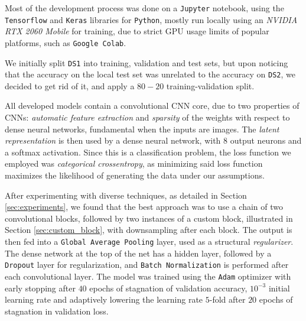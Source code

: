 \documentclass[11pt]{article}
\begin{document}
\begin{multicols}{2}


      Most of the development process was done on a \texttt{Jupyter} notebook, using the \texttt{Tensorflow}\cite{TensorFlow} and \texttt{Keras}\cite{chollet2015keras} libraries for \texttt{Python}, mostly run locally using an \textit{NVIDIA RTX 2060 Mobile} for training, due to strict GPU usage limits of popular platforms, such as \texttt{Google Colab}.

      We initially split \texttt{DS1} into training, validation and test sets, but upon noticing that the accuracy on the local test set was unrelated to the accuracy on \texttt{DS2}, we decided to get rid of it, and apply a $80-20$ training-validation split.

      All developed models contain a convolutional CNN core, due to two properties of CNNs: \textit{automatic feature extraction} and \textit{sparsity} of the weights with respect to dense neural networks, fundamental when the inputs are images. The \textit{latent representation} is then used by a dense neural network, with 8 output neurons and a softmax activation. Since this is a classification problem, the loss function we employed was \textit{categorical crossentropy}, as minimizing said loss function maximizes the likelihood of generating the data\cite{shalev2014understanding} under our assumptions.

      After experimenting with diverse techniques, as detailed in Section \ref{sec:experiments}, we found that the best approach was to use a chain of two convolutional blocks, followed by two instances of a custom block, illustrated in Section \ref{sec:custom_block}, with downsampling after each block. The output is then fed into a \texttt{Global Average Pooling}\cite{Lin2013NetworkIN} layer, used as a structural \textit{regularizer}. The dense network at the top of the net has a hidden layer, followed by a \texttt{Dropout} layer for regularization, and \texttt{Batch Normalization}\cite{pmlr-v37-ioffe15} is performed after each convolutional layer. The model was trained using the \texttt{Adam}\cite{Kingma2014AdamAM} optimizer with early stopping after $40$ epochs of stagnation of validation accuracy, $10^{-3}$ initial learning rate and adaptively lowering the learning rate $5$-fold after $20$ epochs of stagnation in validation loss.


\end{multicols}
\end{document}
